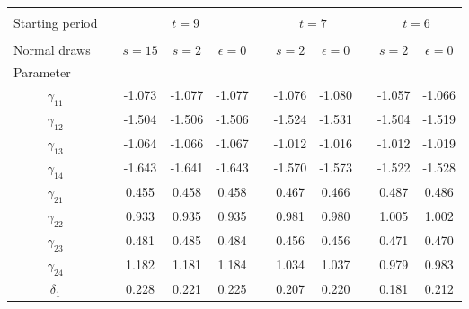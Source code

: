 \begin{tabular}{crccccccccc}
\toprule
\toprule
          &           &           &           &           &           &           &           &           &           &  \\
\multicolumn{1}{l}{Starting period} &           & \multicolumn{3}{c}{$t=9$}         &           & \multicolumn{2}{c}{$t=7$} &           & \multicolumn{2}{c}{$t=6$} \\
\cmidrule{1-1}\cmidrule{3-5}\cmidrule{7-8}\cmidrule{10-11}          &           &           &           &           &           &           &           &           &           &  \\
\multicolumn{1}{l}{Normal draws} &           & $s=15$    & $s=2$     & $\epsilon=0$ &           & $s=2$     & $\epsilon=0$ &           & $s=2$     & $\epsilon=0$ \\
\cmidrule{1-1}\cmidrule{3-5}\cmidrule{7-8}\cmidrule{10-11}\multicolumn{1}{l}{Parameter} &           &           &           &           &           &           &           &           &           &  \\
$\gamma_{11}$ &           & -1.073    & -1.077    & -1.077    &           & -1.076    & -1.080    &           & -1.057    & -1.066 \\
$\gamma_{12}$ &           & -1.504    & -1.506    & -1.506    &           & -1.524    & -1.531    &           & -1.504    & -1.519 \\
$\gamma_{13}$ &           & -1.064    & -1.066    & -1.067    &           & -1.012    & -1.016    &           & -1.012    & -1.019 \\
$\gamma_{14}$ &           & -1.643    & -1.641    & -1.643    &           & -1.570    & -1.573    &           & -1.522    & -1.528 \\
$\gamma_{21}$ &           & 0.455     & 0.458     & 0.458     &           & 0.467     & 0.466     &           & 0.487     & 0.486 \\
$\gamma_{22}$ &           & 0.933     & 0.935     & 0.935     &           & 0.981     & 0.980     &           & 1.005     & 1.002 \\
$\gamma_{23}$ &           & 0.481     & 0.485     & 0.484     &           & 0.456     & 0.456     &           & 0.471     & 0.470 \\
$\gamma_{24}$ &           & 1.182     & 1.181     & 1.184     &           & 1.034     & 1.037     &           & 0.979     & 0.983 \\
$\delta_{1}$ &           & 0.228     & 0.221     & 0.225     &           & 0.207     & 0.220     &           & 0.181     & 0.212 \\

\end{tabular}
